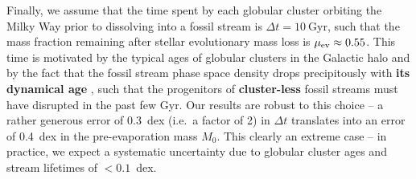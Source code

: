 \documentclass[twocolumn]{aastex63}
\newcommand{\gyr}{\ensuremath{\textrm{Gyr}}}
\newcommand{\changes}[1]{{\textbf{#1}}}
\begin{document}
Finally, we assume that the time spent by each globular cluster orbiting the Milky Way prior to dissolving into a fossil stream is $\Delta t=10~\gyr$, such that the mass fraction remaining after stellar evolutionary mass loss is $\mu_{\rm ev}\approx0.55$.
This time is motivated by the typical ages of globular clusters in the Galactic halo \citep[$\sim12~\gyr$, e.g.][]{kruijssen19e} and by the fact that the fossil stream phase space density drops precipitously with \changes{its dynamical age} \citep{helmi:1999,mestre:2020}, such that the progenitors of \changes{cluster-less} fossil streams must have disrupted in the past few Gyr.
Our results are robust to this choice -- a rather generous error of 0.3~dex (i.e.\ a factor of 2) in $\Delta t$ translates into an error of 0.4~dex in the pre-evaporation mass $M_0$. This clearly an extreme case \citep[e.g.][]{marinfranch09,forbes10,dotter10,dotter11,vandenberg13,kruijssen19e} -- in practice, we expect a systematic uncertainty due to globular cluster ages and stream lifetimes of $<0.1$~dex.
\end{document}
